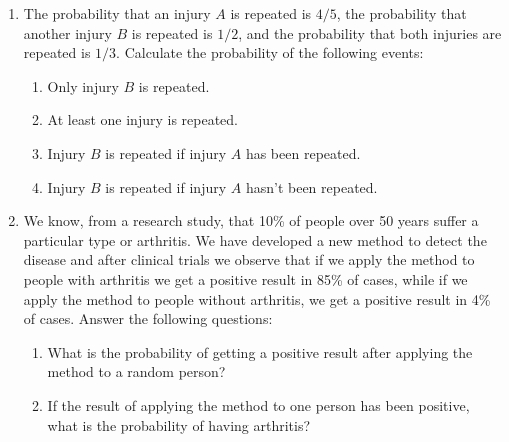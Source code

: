\begin{enumerate}[leftmargin=*,resume]
\item The probability that an injury $A$ is repeated is $4/5$, the probability that another injury $B$ is repeated is
$1/2$, and the probability that both injuries are repeated is $1/3$.
Calculate the probability of the following events:
\begin{enumerate}
\item Only injury $B$ is repeated.
\item At least one injury is repeated.
\item Injury $B$ is repeated if injury $A$ has been repeated.
\item Injury $B$ is repeated if injury $A$ hasn't been repeated. 
\end{enumerate}

\item 
We know, from a research study, that 10\% of people over 50 years suffer a particular type or arthritis.
We have developed a new method to detect the disease and after clinical trials we observe that if we apply the method to
people with arthritis we get a positive result in 85\% of cases, while if we apply the method to people without
arthritis, we get a positive result in 4\% of cases.
Answer the following questions:
\begin{enumerate}
\item What is the probability of getting a positive result after applying the method to a random person?
\item If the result of applying the method to one person has been positive, what is the probability of having arthritis?
\end{enumerate}

% 
% 


\end{enumerate}


